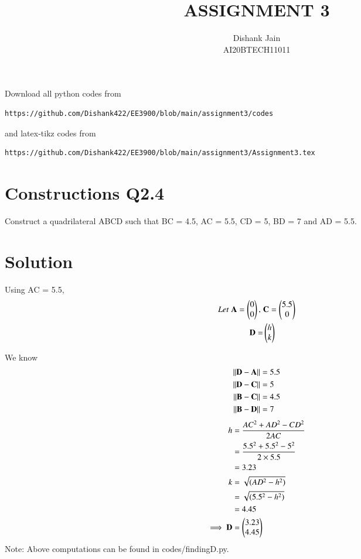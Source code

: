 \documentclass[journal,12pt,twocolumn]{IEEEtran}
\begin{document}
     \def\centbox#1{\makebox[0in]{#1}}
     \def\topbox#1{\raisebox{-\baselineskip}[0in][0in]{#1}}
     \def\midbox#1{\raisebox{-0.5\baselineskip}[0in][0in]{#1}}
\vspace{3cm}
\title{ASSIGNMENT 3}
\author{Dishank Jain \\ AI20BTECH11011}
\maketitle
\newpage
\bigskip
\renewcommand{\thefigure}{\theenumi}
\renewcommand{\thetable}{\theenumi}
Download all python codes from 
\begin{lstlisting}
https://github.com/Dishank422/EE3900/blob/main/assignment3/codes
\end{lstlisting}
%
and latex-tikz codes from 
%
\begin{lstlisting}
https://github.com/Dishank422/EE3900/blob/main/assignment3/Assignment3.tex
\end{lstlisting}
%
\section{Constructions Q2.4}
Construct a quadrilateral ABCD such that BC = 4.5, AC = 5.5, CD = 5, BD = 7  and AD = 5.5.
\section{Solution}
Using AC = 5.5,
\begin{align}
    Let\; \mathbf{A} = \begin{pmatrix}0\\0\end{pmatrix},\; &\mathbf{C} = \begin{pmatrix}5.5\\0\end{pmatrix}\\
    \mathbf{D} = &\begin{pmatrix}h\\k\end{pmatrix}
\end{align}

We know 
\begin{align}
    \lVert\mathbf{D}-\mathbf{A}\rVert &= 5.5\label{DA}\\
    \lVert\mathbf{D}-\mathbf{C}\rVert &= 5\label{DC}\\
    \lVert\mathbf{B}-\mathbf{C}\rVert &= 4.5\label{BC}\\
    \lVert\mathbf{B}-\mathbf{D}\rVert &= 7\label{BD}
\end{align}
\begin{align}
    h &= \dfrac{AC^2+AD^2-CD^2}{2AC}\\
      &= \dfrac{5.5^2+5.5^2-5^2}{2\times 5.5}\\
      &= 3.23\\
    k &= \sqrt{(AD^2-h^2)}\\
      &= \sqrt{(5.5^2-h^2)}\\
      &= 4.45\\
    \implies \mathbf{D} &= \begin{pmatrix}3.23\\4.45\end{pmatrix}
\end{align}
Note: Above computations can be found in codes/finding\textunderscore D.py.
\end{document}
